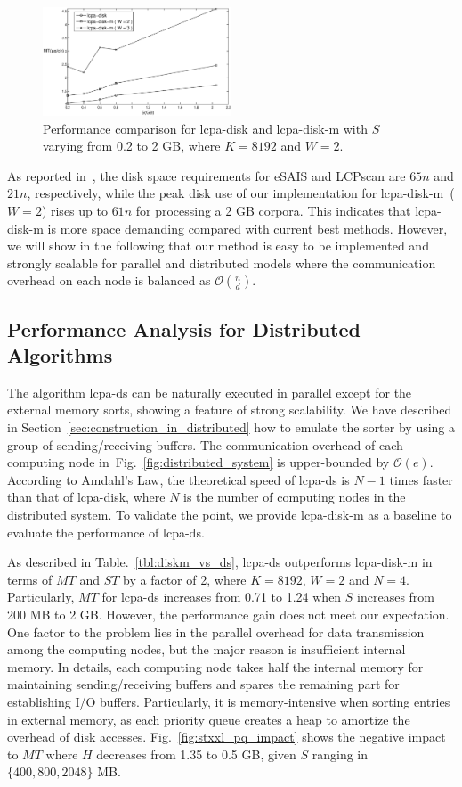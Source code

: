 \documentclass[10pt,journal,compsoc]{IEEEtran}
\begin{document}
\begin{CJK*}{GBK}{song}
\begin{figure}[hbtp!]
  \centering
  \includegraphics[width=0.5\textwidth]{disk_vs_diskm.eps}
  \caption{Performance comparison for lcpa-disk and lcpa-disk-m with $S$ varying from 0.2 to 2 GB, where $K=8192$ and $W=2$.}
  \label{fig:disk_vs_diskm}
\end{figure}

As reported in~\cite{Juha2014}, the disk space requirements for eSAIS and LCPscan are $65n$ and $21n$, respectively, while the peak disk use of our implementation for lcpa-disk-m~($W=2$) rises up to $61n$ for processing a 2 GB corpora. This indicates that {lcpa-disk-m} is more space demanding compared with current best methods. However, we will show in the following that our method is easy to be implemented and strongly scalable for parallel and distributed models where the communication overhead on each node is balanced as $\mathcal{O}(\frac{n}{d})$.


\subsection{Performance Analysis for Distributed Algorithms}

The algorithm lcpa-ds can be naturally executed in parallel except for the external memory sorts, showing a feature of strong scalability. We have described in Section~\ref{sec:construction_in_distributed} how to emulate the sorter by using a group of sending/receiving buffers. The communication overhead of each computing node in~Fig.~\ref{fig:distributed_system} is upper-bounded by $\mathcal{O}(e)$. According to Amdahl's Law, the theoretical speed of lcpa-ds is $N-1$ times faster than that of lcpa-disk, where $N$ is the number of computing nodes in the distributed system. To validate the point, we provide lcpa-disk-m as a baseline to evaluate the performance of lcpa-ds.

As described in Table.~\ref{tbl:diskm_vs_ds}, lcpa-ds outperforms lcpa-disk-m in terms of $MT$ and $ST$ by a factor of 2, where $K=8192$, $W=2$ and $N=4$. Particularly, $MT$ for lcpa-ds increases from 0.71 to 1.24 when $S$ increases from 200 MB to 2 GB. However, the performance gain does not meet our expectation. One factor to the problem lies in the parallel overhead for data transmission among the computing nodes, but the major reason is insufficient internal memory. In details, each computing node takes half the internal memory for maintaining sending/receiving buffers and spares the remaining part for establishing I/O buffers. Particularly, it is memory-intensive when sorting entries in external memory, as each priority queue creates a heap to amortize the overhead of disk accesses. Fig.~\ref{fig:stxxl_pq_impact} shows the negative impact to $MT$ where $H$ decreases from 1.35 to 0.5 GB, given $S$ ranging in $\{400, 800, 2048\}$ MB.


\end{CJK*}
\end{document}
